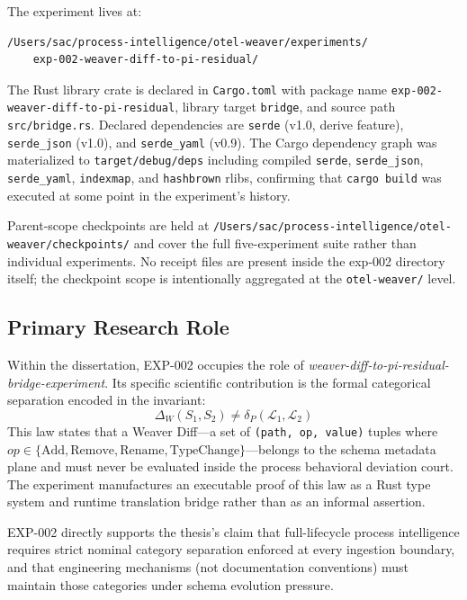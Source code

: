 The experiment lives at:
\begin{verbatim}
/Users/sac/process-intelligence/otel-weaver/experiments/
    exp-002-weaver-diff-to-pi-residual/
\end{verbatim}

The Rust library crate is declared in
\texttt{Cargo.toml} with package name \texttt{exp-002-weaver-diff-to-pi-residual},
library target \texttt{bridge}, and source path \texttt{src/bridge.rs}. Declared
dependencies are \texttt{serde} (v1.0, derive feature), \texttt{serde\_json} (v1.0),
and \texttt{serde\_yaml} (v0.9). The Cargo dependency graph was materialized to
\texttt{target/debug/deps} including compiled \texttt{serde}, \texttt{serde\_json},
\texttt{serde\_yaml}, \texttt{indexmap}, and \texttt{hashbrown} rlibs, confirming that
\texttt{cargo build} was executed at some point in the experiment's history.

Parent-scope checkpoints are held at
\texttt{/Users/sac/process-intelligence/otel-weaver/checkpoints/} and cover the full
five-experiment suite rather than individual experiments. No receipt files are present
inside the exp-002 directory itself; the checkpoint scope is intentionally aggregated
at the \texttt{otel-weaver/} level.

\subsection{Primary Research Role}
\label{sec:otel-weaver-exp-002-diff-to-residual-identity-role}

Within the dissertation, EXP-002 occupies the role of
\emph{weaver-diff-to-pi-residual-bridge-experiment}. Its specific scientific
contribution is the formal categorical separation encoded in the invariant:
\[
    \Delta_W(S_1, S_2) \neq \delta_P(\mathcal{L}_1, \mathcal{L}_2)
\]
This law states that a Weaver Diff---a set of \texttt{(path, op, value)} tuples where
$op \in \{\text{Add}, \text{Remove}, \text{Rename}, \text{TypeChange}\}$---belongs to
the schema metadata plane and must never be evaluated inside the process behavioral
deviation court. The experiment manufactures an executable proof of this law as a
Rust type system and runtime translation bridge rather than as an informal assertion.

EXP-002 directly supports the thesis's claim that full-lifecycle process intelligence
requires strict nominal category separation enforced at every ingestion boundary, and
that engineering mechanisms (not documentation conventions) must maintain those
categories under schema evolution pressure.

